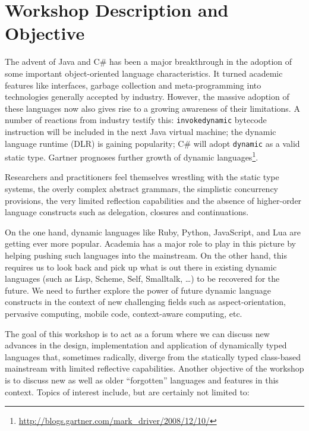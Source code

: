 \documentclass[runningheads]{llncs}
\begin{document}

\section{Workshop Description and Objective}

The advent of Java and C\# has been a major breakthrough in the adoption of some important object-oriented language characteristics. It turned academic features like interfaces, garbage collection and meta-programming into technologies generally accepted by industry. However, the massive adoption of these languages now also gives rise to a growing awareness of their limitations. 
A number of reactions from industry testify this: {\tt invokedynamic} bytecode instruction will be included in the next Java virtual machine; the dynamic language runtime (DLR) is gaining popularity; C\# will adopt  {\tt dynamic} as a valid static type.  %
Gartner prognoses further growth of dynamic languages\footnote{\url{http://blogs.gartner.com/mark_driver/2008/12/10/}}.

Researchers and practitioners feel themselves wrestling with the static type systems, the overly complex abstract grammars, the simplistic concurrency provisions, the very limited reflection capabilities and the absence of higher-order language constructs such as delegation, closures and continuations.

On the one hand, dynamic languages like Ruby, Python, JavaScript, and Lua are getting ever more popular. Academia has a major role to play in this picture by helping pushing such languages into the mainstream. On the other hand, this requires us to look back and pick up what is out there in existing dynamic languages (such as Lisp, Scheme, Self, Smalltalk, \dots) to be recovered for the future. We need to further explore the power of future dynamic language constructs in the context of new challenging fields such as aspect-orientation, pervasive computing, mobile code, context-aware computing, etc. 

The goal of this workshop is to act as a forum where we can discuss new advances in the design, implementation and application of dynamically typed languages that, sometimes radically, diverge from the  statically typed class-based mainstream with limited reflective capabilities. Another objective of the workshop is to discuss new as well as older ``forgotten'' languages and features in this context. Topics of interest include, but are certainly not limited to: 
\end{document}
